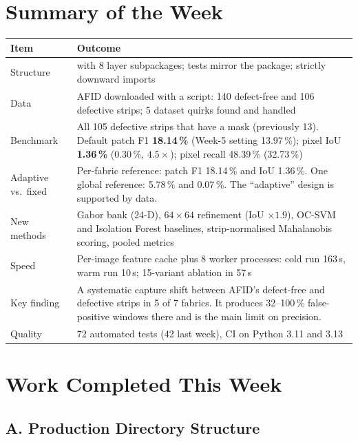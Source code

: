\documentclass[11pt,a4paper]{article}
\newcommand{\code}[1]{\texttt{\detokenize{#1}}}
\begin{document}
\section*{Summary of the Week}
\begin{center}
\renewcommand{\arraystretch}{1.15}
\begin{tabularx}{\textwidth}{@{}lL@{}}
\toprule
\textbf{Item} & \textbf{Outcome} \\
\midrule
Structure & \code{Codes/src/fabric_defect/} with 8 layer subpackages; tests mirror the package; strictly downward imports \\
Data & AFID downloaded with a script: 140 defect-free and 106 defective strips; 5 dataset quirks found and handled \\
Benchmark & All 105 defective strips that have a mask (previously 13). Default patch F1 \textbf{18.14\,\%} (Week-5 setting 13.97\,\%); pixel IoU \textbf{1.36\,\%} (0.30\,\%, $4.5\times$); pixel recall 48.39\,\% (32.73\,\%) \\
Adaptive vs.\ fixed & Per-fabric reference: patch F1 18.14\,\% and IoU 1.36\,\%. One global reference: 5.78\,\% and 0.07\,\%. The ``adaptive'' design is supported by data. \\
New methods & Gabor bank (24-D), $64\times64$ refinement (IoU $\times1.9$), OC-SVM and Isolation Forest baselines, strip-normalised Mahalanobis scoring, pooled metrics \\
Speed & Per-image feature cache plus 8 worker processes: cold run 163\,s, warm run 10\,s; 15-variant ablation in 57\,s \\
Key finding & A systematic capture shift between AFID's defect-free and defective strips in 5 of 7 fabrics. It produces 32--100\,\% false-positive windows there and is the main limit on precision. \\
Quality & 72 automated tests (42 last week), CI on Python 3.11 and 3.13 \\
\bottomrule
\end{tabularx}
\end{center}

\section*{Work Completed This Week}

\subsection*{A. Production Directory Structure}
\end{document}
